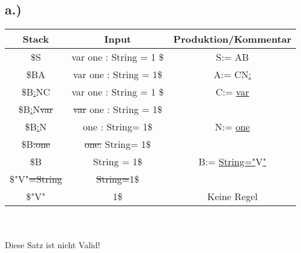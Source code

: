 \documentclass[12pt,runningheads,a4paper]{llncs}
\begin{document}
\subsection*{a.)}
\begin{tabular}{  |c|c|c|  }
 \hline
 Stack&Input &Produktion/Kommentar\\ 
 \hline
 \$S &var one : String = 1 \$ &S:= AB \\
  \hline
 \$BA &var one : String = 1\$ &A:= CN\underline{:}\\
 \hline
 \$B\underline{:}NC &var one : String = 1 \$ &C:= \underline{var}\\
 \hline
 \$B\underline{:}N\st{var} &\st{var} one : String = 1\$ &\\
   \hline
 \$B\underline{:}N &one : String= 1\$ &N:= \underline{one} \\
   \hline
 \$B\st{:}\st{one} &\st{one}\st{:} String= 1\$ & \\
   \hline
 \$B & String = 1\$ & B:= \underline{String}\underline{=}\underline{"}V\underline{"} \\
   \hline
 \$"V"\st{=}\st{String} &\st{String}\st{=}1\$ & \\
   \hline
 \$"V" &1\$ & Keine Regel \\
   \hline
 
 \end{tabular}\\
 \\
 Diese Satz ist nicht Valid!
 \\
\end{document}
